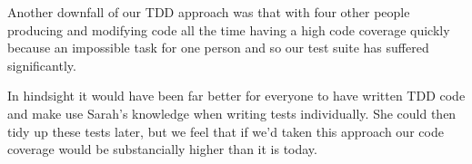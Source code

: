     Another downfall of our TDD approach was that with four other people producing and modifying code all the time having a high code coverage quickly because an impossible task for one person and so our test suite has suffered significantly.

    In hindsight it would have been far better for everyone to have written TDD code and make use Sarah's knowledge when writing tests individually. She could then tidy up these tests later, but we feel that if we'd taken this approach our code coverage would be substancially higher than it is today.